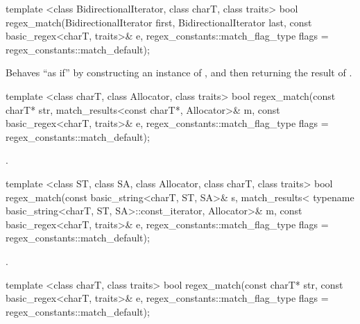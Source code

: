 %
\begin{itemdecl}
template <class BidirectionalIterator, class charT, class traits>
  bool regex_match(BidirectionalIterator first, BidirectionalIterator last,
                   const basic_regex<charT, traits>& e,
                   regex_constants::match_flag_type flags =
                     regex_constants::match_default); 
\end{itemdecl}

\begin{itemdescr}
\pnum
\effects  Behaves ``as if'' by constructing an instance of
, and then 
returning the result of .
\end{itemdescr}

%
\begin{itemdecl}
template <class charT, class Allocator, class traits>
  bool regex_match(const charT* str,
                   match_results<const charT*, Allocator>& m,
                   const basic_regex<charT, traits>& e,
                   regex_constants::match_flag_type flags =
                     regex_constants::match_default); 
\end{itemdecl}

\begin{itemdescr}
\pnum
\returns  {}.
\end{itemdescr}

%
\begin{itemdecl}
template <class ST, class SA, class Allocator, class charT, class traits>
  bool regex_match(const basic_string<charT, ST, SA>& s,
                   match_results<
                     typename basic_string<charT, ST, SA>::const_iterator, 
                     Allocator>& m, 
                   const basic_regex<charT, traits>& e, 
                   regex_constants::match_flag_type flags =
                     regex_constants::match_default); 
\end{itemdecl}

\begin{itemdescr}
\pnum
\returns  {}.
\end{itemdescr}

%
\begin{itemdecl}
template <class charT, class traits>
  bool regex_match(const charT* str,
                   const basic_regex<charT, traits>& e,
                   regex_constants::match_flag_type flags =
                     regex_constants::match_default); 
\end{itemdecl}

